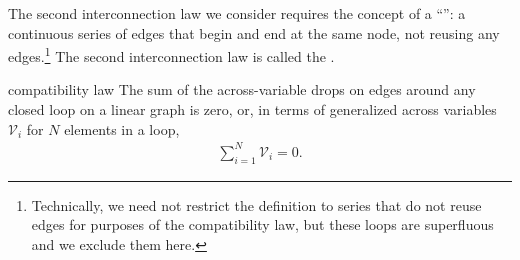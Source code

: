 \documentclass[dynamic_systems.tex]{subfiles}
\begin{document}
The second interconnection law we consider requires the concept of a  ``'': a continuous series of edges that begin and end at the same node, not reusing any edges.\footnote{Technically, we need not restrict the definition to series that do not reuse edges for purposes of the compatibility law, but these loops are superfluous and we exclude them here.}
The second interconnection law is called the .
\tags{}

\begin{Definition}{compatibility law}{}
	The sum of the across-variable drops on edges around any closed loop on a linear graph is zero, or, in terms of generalized across variables $\mathcal{V}_i$ for $N$ elements in a loop, 
	\begin{align}
		\sum_{i=1}^N \mathcal{V}_i = 0.
	\end{align}
\end{Definition}
\end{document}
